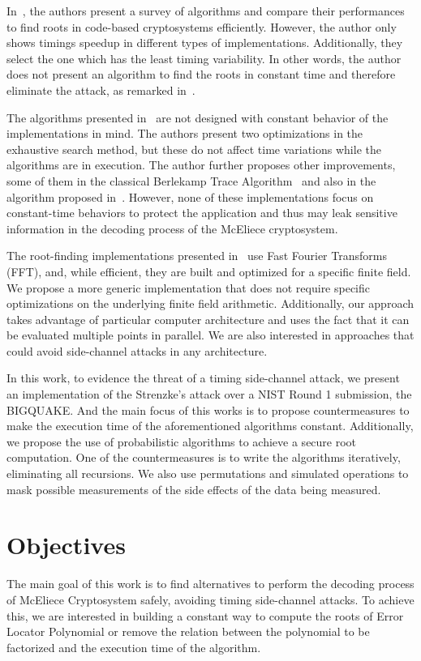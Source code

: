 In~\cite{strenzke2012fast}, the authors present a survey of algorithms and compare their performances to find roots in code-based cryptosystems efficiently. However, the author only shows timings speedup in different types of implementations. Additionally, they select the one which has the least timing variability. In other words, the author does not present an algorithm to find the roots in constant time and therefore eliminate the attack, as remarked in~\cite{strenzke2013efficiency}.

The algorithms presented in~\cite{strenzke2012fast} are not designed with constant behavior of the implementations in mind. The authors present two optimizations in the exhaustive search method, but these do not affect time variations while the algorithms are in execution. The author further proposes other improvements, some of them in the classical Berlekamp Trace Algorithm~\cite{berlekamp1970factoring} and also in the algorithm proposed in~\cite{fedorenko2002finding}. However, none of these implementations focus on constant-time behaviors to protect the application and thus may leak sensitive information in the decoding process of the McEliece cryptosystem.

The root-finding implementations presented in~\cite{chou2017mcbits, bernstein2013mcbits} use Fast Fourier Transforms (FFT), and, while efficient, they are built and optimized for a specific finite field. We propose a more generic implementation that does not require specific optimizations on the underlying finite field arithmetic. Additionally, our approach takes advantage of particular computer architecture and uses the fact that it can be evaluated multiple points in parallel. We are also interested in approaches that could avoid side-channel attacks in any architecture. 

In this work, to evidence the threat of a timing side-channel attack, we present an implementation of the Strenzke's attack over a NIST Round 1 submission, the BIGQUAKE. And the main focus of this works is to propose countermeasures to make the execution time of the aforementioned algorithms constant. Additionally, we propose the use of probabilistic algorithms to achieve a secure root computation. One of the countermeasures is to write the algorithms iteratively, eliminating all recursions. We also use permutations and simulated operations to mask possible measurements of the side effects of the data being measured.

\section{Objectives}
The main goal of this work is to find alternatives to perform the decoding process of McEliece Cryptosystem safely, avoiding timing side-channel attacks. To achieve this, we are interested in building a constant way to compute the roots of Error Locator Polynomial or remove the relation between the polynomial to be factorized and the execution time of the algorithm.


